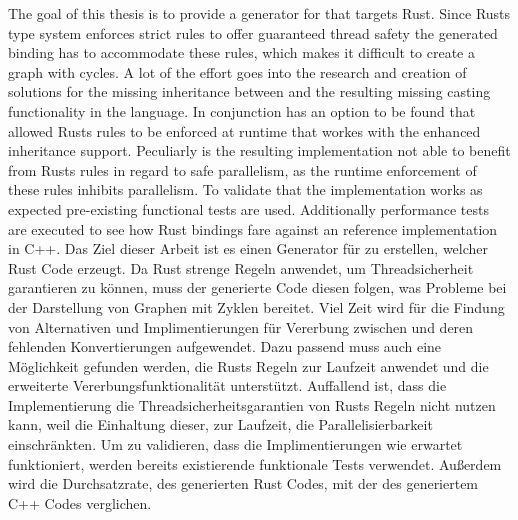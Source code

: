 \documentclass[thesis]{subfiles}
\begin{document}
{
\let\cleardoublepage\relax
{}
The goal of this thesis is to provide a generator for  that targets Rust.
Since Rusts type system enforces strict rules to offer guaranteed thread safety the generated binding has to accommodate these rules, which makes it difficult to create a graph with cycles.
A lot of the effort goes into the research and creation of solutions for the missing inheritance between \structs and the resulting missing casting functionality in the language.
In conjunction has an option to be found that allowed Rusts rules to be enforced at runtime that workes with the enhanced inheritance support.
Peculiarly is the resulting implementation not able to benefit from Rusts rules in regard to safe parallelism, as the runtime enforcement of these rules inhibits parallelism.
To validate that the implementation works as expected pre-existing functional tests are used.
Additionally performance tests are executed to see how Rust bindings fare against an reference implementation in C++.
}
Das Ziel dieser Arbeit ist es einen Generator für  zu erstellen, welcher Rust Code erzeugt.
Da Rust strenge Regeln anwendet, um Threadsicherheit garantieren zu können, muss der generierte Code diesen folgen, was Probleme bei der Darstellung von Graphen mit Zyklen bereitet.
Viel Zeit wird für die Findung von Alternativen und Implimentierungen für Vererbung zwischen \structs und deren fehlenden Konvertierungen aufgewendet.
Dazu passend muss auch eine Möglichkeit gefunden werden, die Rusts Regeln zur Laufzeit anwendet und die erweiterte Vererbungsfunktionalität unterstützt.
Auffallend ist, dass die Implementierung die Threadsicherheitsgarantien von Rusts Regeln  nicht nutzen kann, weil die Einhaltung dieser, zur Laufzeit, die Parallelisierbarkeit einschränkten.
Um zu validieren, dass die Implimentierungen wie erwartet funktioniert, werden bereits existierende funktionale Tests verwendet.
Außerdem wird die Durchsatzrate, des generierten Rust Codes, mit der des generiertem C++ Codes verglichen.
\end{document}
